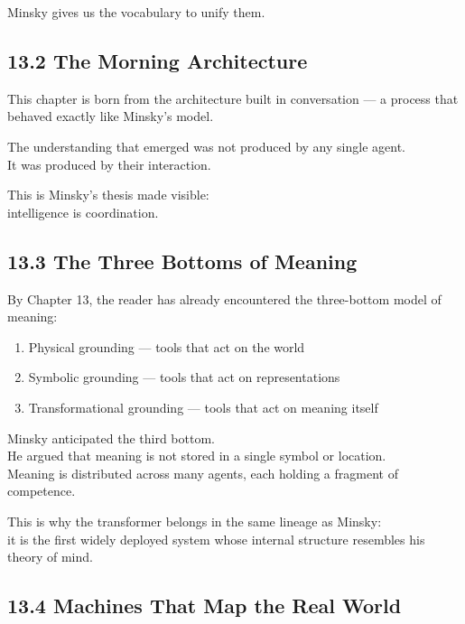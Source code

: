 \documentclass[
]{article}
\providecommand{\tightlist}{%
  \setlength{\itemsep}{0pt}\setlength{\parskip}{0pt}}
\begin{document}
Minsky gives us the vocabulary to unify them.

\hypertarget{the-morning-architecture}{%
\subsection{13.2 The Morning
Architecture}\label{the-morning-architecture}}

This chapter is born from the architecture built in conversation --- a
process that behaved exactly like Minsky's model.

The understanding that emerged was not produced by any single agent.\\
It was produced by their interaction.

This is Minsky's thesis made visible:\\
intelligence is coordination.

\hypertarget{the-three-bottoms-of-meaning}{%
\subsection{13.3 The Three Bottoms of
Meaning}\label{the-three-bottoms-of-meaning}}

By Chapter 13, the reader has already encountered the three-bottom model
of meaning:

\begin{enumerate}
\def\labelenumi{\arabic{enumi}.}
\tightlist
\item
  Physical grounding --- tools that act on the world\\
\item
  Symbolic grounding --- tools that act on representations\\
\item
  Transformational grounding --- tools that act on meaning itself
\end{enumerate}

Minsky anticipated the third bottom.\\
He argued that meaning is not stored in a single symbol or location.\\
Meaning is distributed across many agents, each holding a fragment of
competence.

This is why the transformer belongs in the same lineage as Minsky:\\
it is the first widely deployed system whose internal structure
resembles his theory of mind.

\hypertarget{machines-that-map-the-real-world}{%
\subsection{13.4 Machines That Map the Real
World}\label{machines-that-map-the-real-world}}
\end{document}
